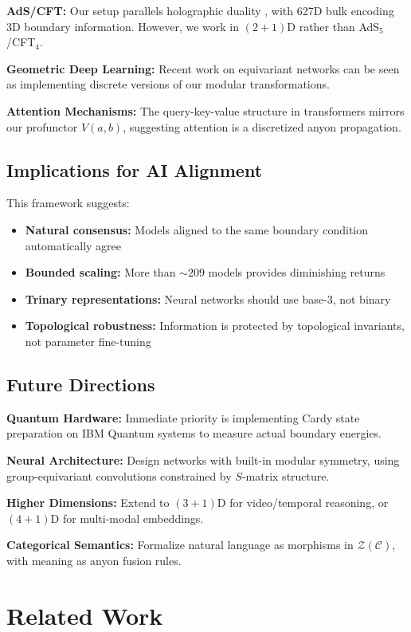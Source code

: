 \documentclass[11pt]{article}
\begin{document}
\textbf{AdS/CFT:} Our setup parallels holographic duality \cite{maldacena1999}, with 627D bulk encoding 3D boundary information. However, we work in $(2+1)$D rather than AdS$_5$/CFT$_4$.

\textbf{Geometric Deep Learning:} Recent work on equivariant networks \cite{bronstein2021} can be seen as implementing discrete versions of our modular transformations.

\textbf{Attention Mechanisms:} The query-key-value structure in transformers \cite{vaswani2017} mirrors our profunctor $V(a,b)$, suggesting attention is a discretized anyon propagation.

\subsection{Implications for AI Alignment}

This framework suggests:
\begin{itemize}
\item \textbf{Natural consensus:} Models aligned to the same boundary condition automatically agree
\item \textbf{Bounded scaling:} More than $\sim 209$ models provides diminishing returns
\item \textbf{Trinary representations:} Neural networks should use base-3, not binary
\item \textbf{Topological robustness:} Information is protected by topological invariants, not parameter fine-tuning
\end{itemize}

\subsection{Future Directions}

\textbf{Quantum Hardware:} Immediate priority is implementing Cardy state preparation on IBM Quantum systems to measure actual boundary energies.

\textbf{Neural Architecture:} Design networks with built-in modular symmetry, using group-equivariant convolutions constrained by $S$-matrix structure.

\textbf{Higher Dimensions:} Extend to $(3+1)$D for video/temporal reasoning, or $(4+1)$D for multi-modal embeddings.

\textbf{Categorical Semantics:} Formalize natural language as morphisms in $\mathcal{Z}(\mathcal{C})$, with meaning as anyon fusion rules.

\section{Related Work}
\end{document}
